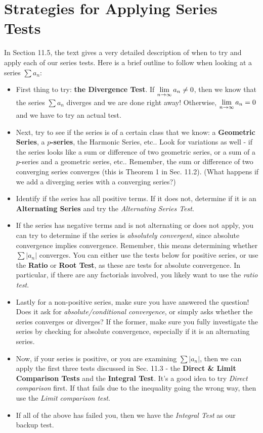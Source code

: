 \documentclass{ximera}
\theoremstyle{definition}
\begin{document}
\section*{Strategies for Applying Series Tests} In Section 11.5, the text gives a very detailed description of when to try and apply each of our series tests. Here is a brief outline to follow when looking at a series $\sum a_n$:
	\begin{itemize}
		\item First thing to try: \textbf{the Divergence Test}. If $\displaystyle \lim_{n \to \infty} a_n \neq 0$, then we know that the series $\sum a_n$ diverges and we are done right away! Otherwise, $\displaystyle \lim_{n \to \infty} a_n = 0$ and we have to try an actual test.
		
		\item Next, try to see if the series is of a certain class that we know: a \textbf{Geometric Series}, a \textbf{$p$-series}, the Harmonic Series, etc.. Look for variations as well - if the series looks like a sum or difference of two geometric series, or a sum of a $p$-series and a geometric series, etc.. Remember, the sum or difference of two converging series converges (this is Theorem 1 in Sec. 11.2). (What happens if we add a diverging series with a converging series?)
		
		\item Identify if the series has all positive terms. If it does not, determine if it is an \textbf{Alternating Series} and try the \emph{Alternating Series Test}.
		
		\item If the series has negative terms and is not alternating or does not apply, you can try to determine if the series is \emph{absolutely convergent}, since absolute convergence implies convergence. Remember, this means determining whether $\sum |a_n|$ converges. You can either use the tests below for positive series, or use the \textbf{Ratio} or \textbf{Root Test}, as these are tests for absolute convergence. In particular, if there are any factorials involved, you likely want to use the \emph{ratio test}.
		
		\item Lastly for a non-positive series, make sure you have answered the question! Does it ask for \emph{absolute/conditional convergence}, or simply asks whether the series converges or diverges? If the former, make sure you fully investigate the series by checking for absolute convergence, especially if it is an alternating series.
		
		\item Now, if your series is positive, or you are examining $\sum |a_n|$, then we can apply the first three tests discussed in Sec. 11.3 - the \textbf{Direct \& Limit Comparison Tests} and the \textbf{Integral Test}. It's a good idea to try \emph{Direct comparison} first. If that fails due to the inequality going the wrong way, then use the \emph{Limit comparison test}.
		
		\item If all of the above has failed you, then we have the \emph{Integral Test} as our backup test. 
	\end{itemize}	
\end{document}
